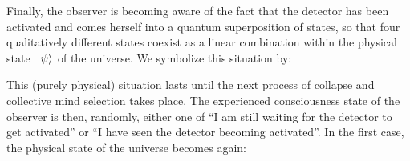 \documentclass[10pt,a4paper,twoside,openany]{book}
\begin{document}
Finally, the observer is becoming aware of the fact that the detector has been activated and comes herself into a quantum superposition of states, so that four qualitatively different states coexist as a linear combination within the physical state $\ \left|{\psi}\right\rangle$ of the universe. We symbolize this situation by:
\begin{flushleft}
\ExcitedAtom\hspace*{3mm}\DetectorOff\hspace*{3mm}\ObserverOff
\hspace*{3mm}\Superposition\hspace*{3mm}
\Atom\hspace*{3mm}\Photon\hspace*{3mm}\DetectorOff\hspace*{3mm}\ObserverOff
\hspace*{3mm}\Superposition\hspace*{3mm}
\Atom\hspace*{3mm}\DetectorOn\hspace*{3mm}\ObserverOff
\hspace*{3mm}\Superposition\hspace*{3mm}
\Atom\hspace*{3mm}\DetectorOn\hspace*{3mm}\ObserverOn
\end{flushleft}
This (purely physical) situation lasts until the next process of collapse and collective mind selection takes place. The experienced consciousness state of the observer is then, randomly, either one of ``I am still waiting for the detector to get activated'' or ``I have seen the detector becoming activated''. In the first case, the physical state of the universe becomes again:
\begin{flushleft}
\ExcitedAtom\hspace*{3mm}\DetectorOff\hspace*{3mm}\ObserverOff
\hspace*{3mm}\Superposition\hspace*{3mm}
\Atom\hspace*{3mm}\Photon\hspace*{3mm}\DetectorOff\hspace*{3mm}\ObserverOff
\hspace*{3mm}\Superposition\hspace*{3mm}
\Atom\hspace*{3mm}\DetectorOn\hspace*{3mm}\ObserverOff
\end{flushleft}
\end{document}
